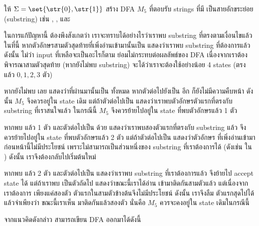 \begin{example}\label{ex:dfa-001sub}
ให้ $\Sigma=\set{\str{0},\str{1}}$ \enskip สร้าง DFA $M_5$ ที่ตอบรับ strings ที่มี  เป็นสายอักขระย่อย (substring) เช่น , , และ 

ในการแก้ปัญหานี้ ต้องพึงสังเกตว่า เราจะทราบได้อย่างไรว่าเราพบ substring ที่ตรงตามเงื่อนไขแล้ว \enskip ในที่นี้ หากตัวอักษรสามตัวสุดท้ายที่เพิ่งอ่านเข้ามานั้นเป็น  แสดงว่าเราพบ substring ที่ต้องการแล้ว \enskip ดังนั้น ไม่ว่า input ที่เหลือจะเป็นอะไรก็ตาม ย่อมไม่กระทบต่อผลลัพธ์ของ DFA \enskip เนื่องจากเราต้องพิจารณาสามตัวสุดท้าย (หากยังไม่พบ substring) จะได้ว่าเราจะต้องใช้อย่างน้อย 4 states (ตรงแล้ว $0,1,2,3$ ตัว)

หากยังไม่พบ  เลย แสดงว่าที่ผ่านมานั้นเป็น  ทั้งหมด \enskip หากตัวต่อไปยังเป็น  อีก ก็ยังไม่มีความคืบหน้า ดังนั้น $M_5$ จึงควรอยู่ใน state เดิม \enskip แต่ถ้าตัวต่อไปเป็น  แสดงว่าเราพบตัวอักษรตัวแรกที่ตรงกับ substring ที่เราสนใจแล้ว \enskip ในกรณีนี้ $M_5$ จึงควรย้ายไปอยู่ใน state ที่พบตัวอักษรแล้ว 1 ตัว

หากพบ  แล้ว 1 ตัว และตัวต่อไปเป็น  ด้วย แสดงว่าเราพบสองตัวแรกที่ตรงกับ substring แล้ว จึงควรย้ายไปอยู่ใน state ที่พบตัวอักษรแล้ว 2 ตัว \enskip แต่ถ้าตัวต่อไปเป็น  แสดงว่าตัวอักษร  ที่เพิ่งอ่านเข้ามาก่อนหน้านี้ไม่มีประโยชน์ เพราะไม่สามารถเป็นส่วนหนึ่งของ substring ที่เราต้องการได้ (ดังเช่น  ใน ) ดังนั้น เราจึงต้องกลับไปเริ่มต้นใหม่

หากพบ  แล้ว 2 ตัว และตัวต่อไปเป็น  แสดงว่าเราพบ substring ที่เราต้องการแล้ว จึงย้ายไป accept state ได้ \enskip แต่ถ้าเราพบ  เป็นตัวถัดไป แสดงว่าขณะนี้เราได้อ่าน  เข้ามาติดกันสามตัวแล้ว แต่เนื่องจากเราต้องการ  เพียงแค่สองตัว ตัวแรกในสามตัวข้างต้นจึงไม่มีประโยชน์ \enskip ดังนั้น เราจึงลืม  ตัวแรกสุดไปได้ แล้วจำเพียงว่า ขณะนี้เราเห็น  มาติดกันแล้วสองตัว \enskip นั่นคือ $M_5$ ควรจะคงอยู่ใน state เดิมในกรณีนี้

จากแนวคิดดังกล่าว สามารถเขียน DFA ออกมาได้ดังนี้
\begin{center}
\end{center}
\end{example}

